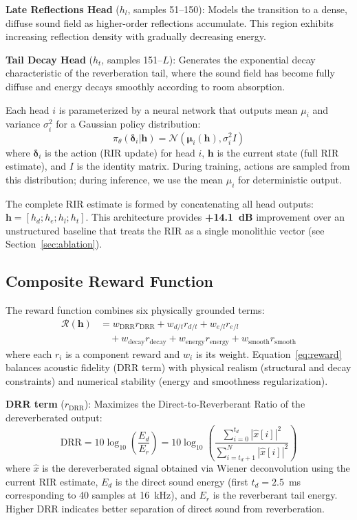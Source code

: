 \documentclass[10pt,conference]{IEEEtran}
\begin{document}
\textbf{Late Reflections Head} ($h_l$, samples 51--150): Models the transition to a dense, diffuse sound field as higher-order reflections accumulate. This region exhibits increasing reflection density with gradually decreasing energy.

\textbf{Tail Decay Head} ($h_t$, samples 151--$L$): Generates the exponential decay characteristic of the reverberation tail, where the sound field has become fully diffuse and energy decays smoothly according to room absorption.

Each head $i$ is parameterized by a neural network that outputs mean $\mu_i$ and variance $\sigma_i^2$ for a Gaussian policy distribution:
\begin{equation}
\pi_\theta(\boldsymbol{\delta}_i|\mathbf{h}) = \mathcal{N}(\boldsymbol{\mu}_i(\mathbf{h}), \sigma_i^2 I)
\label{eq:policy}
\end{equation}
where $\boldsymbol{\delta}_i$ is the action (RIR update) for head $i$, $\mathbf{h}$ is the current state (full RIR estimate), and $I$ is the identity matrix. During training, actions are sampled from this distribution; during inference, we use the mean $\mu_i$ for deterministic output.

The complete RIR estimate is formed by concatenating all head outputs: $\mathbf{h} = [h_d; h_e; h_l; h_t]$. This architecture provides \textbf{+14.1~dB} improvement over an unstructured baseline that treats the RIR as a single monolithic vector (see Section~\ref{sec:ablation}).

\subsection{Composite Reward Function}

The reward function combines six physically grounded terms:
\begin{align}
\mathcal{R}(\mathbf{h}) &= w_{\text{DRR}} r_{\text{DRR}} + w_{d/t} r_{d/t} + w_{e/l} r_{e/l} \nonumber\\
&\quad + w_{\text{decay}} r_{\text{decay}} + w_{\text{energy}} r_{\text{energy}} + w_{\text{smooth}} r_{\text{smooth}}
\label{eq:reward}
\end{align}
where each $r_i$ is a component reward and $w_i$ is its weight. Equation~\ref{eq:reward} balances acoustic fidelity (DRR term) with physical realism (structural and decay constraints) and numerical stability (energy and smoothness regularization).

\textbf{DRR term} ($r_{\text{DRR}}$): Maximizes the Direct-to-Reverberant Ratio of the dereverberated output:
\begin{equation}
\text{DRR} = 10\log_{10}\left(\frac{E_d}{E_r}\right) = 10\log_{10}\left(\frac{\sum_{i=0}^{t_d}|\hat{x}[i]|^2}{\sum_{i=t_d+1}^{N}|\hat{x}[i]|^2}\right)
\label{eq:drr}
\end{equation}
where $\hat{x}$ is the dereverberated signal obtained via Wiener deconvolution using the current RIR estimate, $E_d$ is the direct sound energy (first $t_d=2.5$~ms corresponding to 40 samples at 16~kHz), and $E_r$ is the reverberant tail energy. Higher DRR indicates better separation of direct sound from reverberation.
\end{document}
